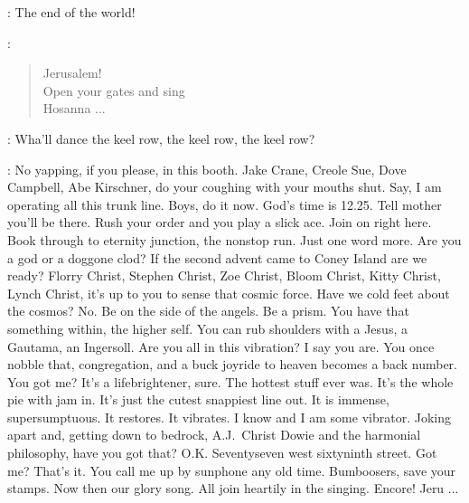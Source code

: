 \Florry:
The end of the world!


\Gramophone:
\begin{verse}
    Jerusalem!\\
    Open your gates and sing\\
    Hosanna ...
\end{verse}


\EndOfWorld:
Wha'll dance the keel row, the keel row, the keel row?


\Elijah:
No yapping, if you please, in this booth.
Jake Crane, Creole Sue, Dove Campbell, Abe Kirschner,
do your coughing with your mouths shut.
Say, I am operating all this trunk line.
Boys, do it now.
God's time is 12.25.
Tell mother you'll be there.
Rush your order and you play a slick ace.
Join on right here.
Book through to eternity junction, the nonstop run.
Just one word more.
Are you a god or a doggone clod?
If the second advent came to Coney Island are we ready?
Florry Christ, Stephen Christ, Zoe Christ, Bloom Christ, Kitty Christ, Lynch Christ,
it's up to you to sense that cosmic force.
Have we cold feet about the cosmos?
No. Be on the side of the angels.
Be a prism.
You have that something within, the higher self.
You can rub shoulders with a Jesus, a Gautama, an Ingersoll.
Are you all in this vibration?
I say you are.
You once nobble that, congregation,
and a buck joyride to heaven becomes a back number.
You got me?
It's a lifebrightener, sure.
The hottest stuff ever was.
It's the whole pie with jam in.
It's just the cutest snappiest line out.
It is immense, supersumptuous.
It restores.
It vibrates.
I know and I am some vibrator.
Joking apart and, getting down to bedrock, A.J.~Christ Dowie
and the harmonial philosophy, have you got that?
O.K.
Seventyseven west sixtyninth street.
Got me?
That's it.
You call me up by sunphone any old time.
Bumboosers, save your stamps.
Now then our glory song.
All join heartily in the singing.
Encore!
Jeru ...

